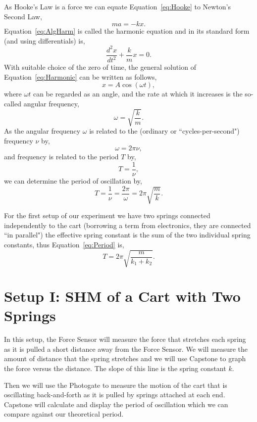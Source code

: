 \documentclass[main.tex]{subfiles}
\begin{document}
As Hooke's Law is a force we can equate Equation~\eqref{eq:Hooke} to Newton's Second Law,
\begin{equation} \label{eq:AlgHarm}
ma=-kx.
\end{equation}
Equation~\eqref{eq:AlgHarm} is called the harmonic equation and in its standard form (and using differentials) is,
\begin{equation} \label{eq:Harmonic}
\frac{d^2x}{dt^2}+\frac{k}{m}x=0.
\end{equation}
With suitable choice of the zero of time, the general solution of Equation~\eqref{eq:Harmonic} can be written as follows,
\begin{equation}
x=A\cos(\omega t),
\end{equation}
where $\omega t$ can be regarded as an angle, and the rate at which it increases is the so-called angular frequency,
\begin{equation}
\omega=\sqrt{\frac{k}{m}}.
\end{equation}
As the angular frequency $\omega$ is related to the (ordinary or ``cycles-per-second") frequency $\nu$ by,
\[
\omega=2\pi\nu,
\]
and frequency is related to the period $T$ by,
\[
T=\frac{1}{\nu},
\]
we can determine the period of oscillation by,
\begin{equation} \label{eq:Period}
T=\frac{1}{\nu}=\frac{2\pi}{\omega}=2\pi\sqrt{\frac{m}{k}}.
\end{equation}

For the first setup of our experiment we have two springs connected independently to the cart (borrowing a term from electronics, they are connected ``in parallel") the effective spring constant is the sum of the two individual spring constants, thus Equation~\eqref{eq:Period} is,
\begin{equation} \label{eq:2SpringPeriod}
T=2\pi\sqrt{\frac{m}{k_1+k_2}}.
\end{equation}

\section{Setup I: SHM of a Cart with Two Springs}
In this setup, the Force Sensor will measure the force that stretches each spring as it is pulled a short distance away from the Force Sensor. We will measure the amount of distance that the spring stretches and we will use Capstone to graph the force versus the distance. The slope of this line is the spring constant $k.$

Then we will use the Photogate to measure the motion of the cart that is oscillating back-and-forth as it is pulled by springs attached at each end. Capstone will calculate and display the period of oscillation which we can compare against our theoretical period.
\end{document}
